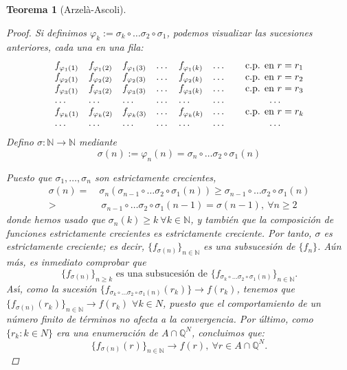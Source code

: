 \documentclass[11pt, a4paper]{article}
\theoremstyle{theorem-style}
\newtheorem{nth}{Teorema}[section]
\theoremstyle{definition-style}
\theoremstyle{remark-style}
\theoremstyle{example-style}
\begin{document}
\begin{nth}[Arzelà-Ascoli]
\begin{proof}
    Si definimos $\varphi_k:= \sigma_k \circ \dots \sigma_2 \circ\sigma_1$, podemos visualizar las sucesiones anteriores, cada una en una fila:
    \[
      \begin{array}{lllllll}
        {f_{\varphi_1 (1)}}& f_{\varphi_1 (2)} & f_{\varphi_1 (3)} & \dots &f_{\varphi_1 (k)} & \dots & \hspace{0.25cm} \mbox{ c.p. en } r=r_1
        \\
        f_{\varphi_2 (1)} & {f_{\varphi_2 (2)}} & f_{\varphi_2 (3)} & \dots &f_{\varphi_2 (k)} & \dots & \hspace{0.25cm} \mbox{ c.p. en } r=r_2
        \\
        f_{\varphi_3 (1)} & f_{\varphi_3 (2)} & {f_{\varphi_3 (3)}} & \dots &f_{\varphi_3 (k)} & \dots & \hspace{0.25cm} \mbox{ c.p. en } r=r_3
        \\
        \dots & \dots & \dots& \dots &\dots & \dots & \hspace{1.25cm} \dots
        \\
        f_{\varphi_k (1)} & f_{\varphi_k (2)} & f_{\varphi_k (3)} & \dots &{f_{\varphi_k (k)}} & \dots & \hspace{0.25cm} \mbox{ c.p. en } r=r_k
        \\
        \dots & \dots & \dots& \dots &\dots & \dots & \hspace{1.25cm} \dots
      \end{array}
    \]
    Defino $\sigma:\mathbb N\longrightarrow \mathbb N$ mediante
    \[
      \sigma (n):= \varphi_n(n)= \sigma_n \circ \dots \sigma_2 \circ\sigma_1 (n)
    \]

    Puesto que $\sigma_1, \dots ,\sigma_n$ son estrictamente crecientes, 
    \[
      \begin{aligned}
        \sigma (n) = \ & \sigma_n ( \sigma_{n-1} \circ \dots \sigma_2 \circ\sigma_1 (n)) 
        \geq \sigma_{n-1} \circ \dots \sigma_2 \circ\sigma_1 (n)
        \\
        >& \ \sigma_{n-1} \circ \dots \sigma_2 \circ\sigma_1 (n-1) = \sigma (n-1) , \ \forall n\geq 2
      \end{aligned}
    \]
    donde hemos usado que $\sigma_n(k) \ge k \ \forall k \in \mathbb{N}$, y también que la composición de funciones estrictamente crecientes es estrictamente creciente. Por tanto, $\sigma$ es estrictamente creciente; es decir,  $\{f_{\sigma (n)} \}_{n\in\mathbb N}$ es una subsucesión de $\{f_n\}$. A\'un m\'as, es inmediato comprobar que
    \[
      \{f_{\sigma (n)}\}_{n\geq k} \mbox{ es una subsucesi\'on de } 
      \{ f_{\sigma_k \circ \dots \sigma_2 \circ\sigma_1 (n)}  \}_{n\in\mathbb N} .
    \]
    As\'{\i}, como la sucesión $\{ f_{\sigma_k \circ \dots \sigma_2 \circ\sigma_1 (n)} (r_k) \} \to f(r_k)$, tenemos que $\{f_{\sigma (n)} (r_k) \}_{n\in\mathbb N} \longrightarrow f(r_k)$ $\forall k\in N$, puesto que el comportamiento de un número finito de términos no afecta a la convergencia. Por último, como $\{r_k : k \in N \}$ era una enumeración de $A \cap \mathbb Q^N$, concluimos que:
    \[
      \{f_{\sigma (n)} (r) \}_{n\in\mathbb N} \longrightarrow f(r), \ \forall r\in A\cap \mathbb Q^N.
    \]


\end{proof}
\end{nth}
\end{document}
